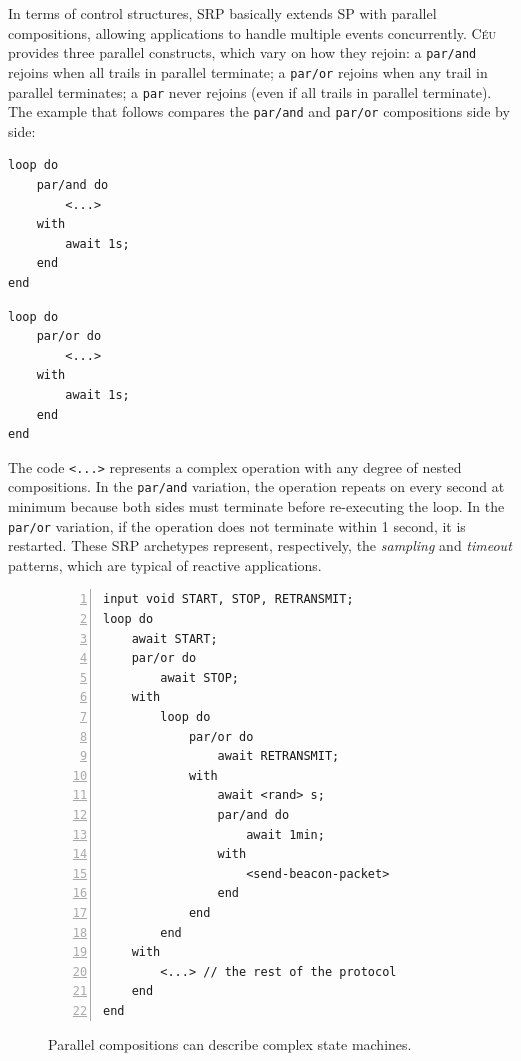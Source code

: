 \documentclass{acm_proc_article-sp}
\newcommand{\CEU}{\textsc{C\'{e}u}\xspace}
\newcommand{\code}[1] {{\small{\texttt{#1}}}}
\newcommand{\1}{\;}
\newcommand{\2}{\;\;}
\newcommand{\3}{\;\;\;}
\newcommand{\5}{\;\;\;\;\;}
\begin{document}
In terms of control structures, SRP basically extends SP with parallel 
compositions, allowing applications to handle multiple events concurrently.
%
\CEU provides three parallel constructs, which vary on how they rejoin:
a \code{par/and} rejoins when all trails in parallel terminate;
a \code{par/or} rejoins when any trail in parallel terminates;
a \code{par} never rejoins (even if all trails in parallel terminate).
%
The example that follows compares the \code{par/and} and \code{par/or} 
compositions side by side:

\begin{minipage}[t]{0.40\linewidth}
\begin{lstlisting}
loop do
    par/and do
        <...>
    with
        await 1s;
    end
end
\end{lstlisting}
\end{minipage}
%
\begin{minipage}[t]{0.40\linewidth}
\begin{lstlisting}
loop do
    par/or do
        <...>
    with
        await 1s;
    end
end
\end{lstlisting}
\end{minipage}

The code \code{<...>} represents a complex operation with any degree of nested 
compositions.
%
In the \code{par/and} variation, the operation repeats on every second at 
minimum because both sides must terminate before re-executing the loop.
In the \code{par/or} variation, if the operation does not terminate within 1 
second, it is restarted.
%
These SRP archetypes represent, respectively, the \emph{sampling} and 
\emph{timeout} patterns, which are typical of reactive applications.


\begin{figure}[t]
\begin{lstlisting}[numbers=left,xleftmargin=3em]
input void START, STOP, RETRANSMIT;
loop do
    await START;
    par/or do
        await STOP;
    with
        loop do
            par/or do
                await RETRANSMIT;
            with
                await <rand> s;
                par/and do
                    await 1min;
                with
                    <send-beacon-packet>
                end
            end
        end
    with
        <...> // the rest of the protocol
    end
end
\end{lstlisting}
\caption{ Parallel compositions can describe complex state machines.
\label{lst.ctp}
}
\end{figure}
\end{document}
